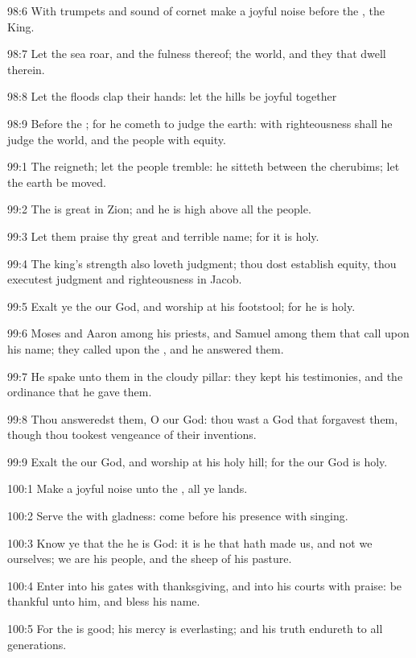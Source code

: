98:6 With trumpets and sound of cornet make a joyful noise before the
\LORD, the King.

98:7 Let the sea roar, and the fulness thereof; the world, and they
that dwell therein.

98:8 Let the floods clap their hands: let the hills be joyful together

98:9 Before the \LORD; for he cometh to judge the earth: with
righteousness shall he judge the world, and the people with equity.



99:1 The \LORD reigneth; let the people tremble: he sitteth between the
cherubims; let the earth be moved.

99:2 The \LORD is great in Zion; and he is high above all the people.

99:3 Let them praise thy great and terrible name; for it is holy.

99:4 The king's strength also loveth judgment; thou dost establish
equity, thou executest judgment and righteousness in Jacob.

99:5 Exalt ye the \LORD our God, and worship at his footstool; for he
is holy.

99:6 Moses and Aaron among his priests, and Samuel among them that
call upon his name; they called upon the \LORD, and he answered them.

99:7 He spake unto them in the cloudy pillar: they kept his
testimonies, and the ordinance that he gave them.

99:8 Thou answeredst them, O \LORD our God: thou wast a God that
forgavest them, though thou tookest vengeance of their inventions.

99:9 Exalt the \LORD our God, and worship at his holy hill; for the
\LORD our God is holy.



100:1 Make a joyful noise unto the \LORD, all ye lands.

100:2 Serve the \LORD with gladness: come before his presence with
singing.

100:3 Know ye that the \LORD he is God: it is he that hath made us, and
not we ourselves; we are his people, and the sheep of his pasture.

100:4 Enter into his gates with thanksgiving, and into his courts with
praise: be thankful unto him, and bless his name.

100:5 For the \LORD is good; his mercy is everlasting; and his truth
endureth to all generations.



